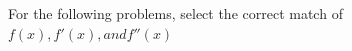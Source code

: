 \documentclass{ximera}
\begin{document}
\begin{question}
For the following problems, select the correct match of $f(x),f'(x), and f''(x)$

\begin{multipleChoice}
\end{multipleChoice}


\end{question}
\end{document}

